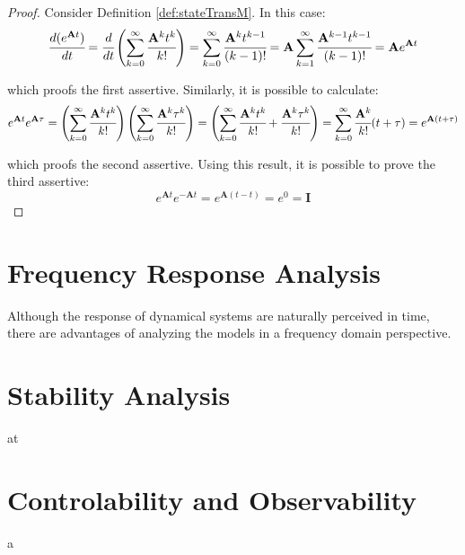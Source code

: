 \documentclass[a4paper,11pt]{book}
\numberwithin{figure}{chapter}
\numberwithin{equation}{chapter}
\numberwithin{table}{chapter}
\theoremstyle{definition}
\begin{document}
\begin{proof}
	Consider Definition \ref{def:stateTransM}. In this case:
	\begin{equation}
		\cfrac{d ( e^{\mathbf{A} t})}{dt} = \cfrac{d}{dt} \left( \sum_{k=0}^{\infty} \cfrac{\mathbf{A}^k  t^k}{k!} \right) = \sum_{k=0}^{\infty} \cfrac{\mathbf{A}^k  t^{k-1}}{(k-1)!}  = \mathbf{A} \sum_{k=1}^{\infty} \cfrac{\mathbf{A}^{k-1}  t^{k-1}}{(k-1)!}  = \mathbf{A} e^{\mathbf{A} t}
	\end{equation}

\noindent which proofs the first assertive. Similarly, it is possible to calculate:
	\begin{equation}
		 e^{\mathbf{A} t} e^{\mathbf{A} \tau} = \left( \sum_{k=0}^{\infty} \cfrac{\mathbf{A}^k  t^k}{k!} \right) \left( \sum_{k=0}^{\infty} \cfrac{\mathbf{A}^k  \tau^k}{k!} \right) = \left( \sum_{k=0}^{\infty} \cfrac{\mathbf{A}^k  t^k}{k!} + \cfrac{\mathbf{A}^k  \tau^k}{k!} \right) = \sum_{k=0}^{\infty} \cfrac{\mathbf{A}^k}{k!} (t + \tau) = e^{\mathbf{A} (t+\tau)}
	\end{equation}

\noindent which proofs the second assertive.  Using this result, it is possible to prove the third assertive:
	\begin{equation}
		 e^{\mathbf{A} t} e^{-\mathbf{A} t} = e^{\mathbf{A} (t-t)} = e^{0} = \mathbf{I}  
	\end{equation} 
\end{proof}



\section{Frequency Response Analysis}

Although the response of dynamical systems are naturally perceived in time, there are advantages of analyzing the models in a frequency domain perspective.

\section{Stability Analysis}

at

\section{Controlability and Observability}

a

\clearpage
\end{document}
